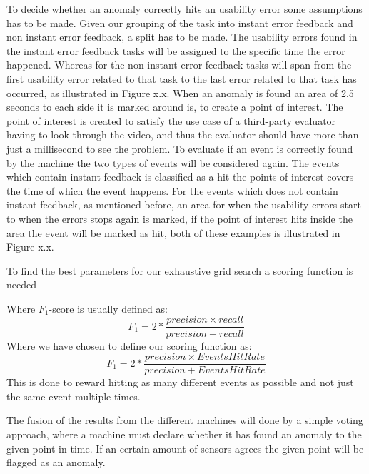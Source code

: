 To decide whether an anomaly correctly hits an usability error some assumptions has to be made. Given our grouping of the task into instant error feedback and non instant error feedback, a split has to be made. The usability errors found in the instant error feedback tasks will be assigned to the specific time the error happened. Whereas for the non instant error feedback tasks will span from the first usability error related to that task to the last error related to that task has occurred, as illustrated in Figure x.x.
When an anomaly is found an area of 2.5 seconds to each side it is marked around is, to create a point of interest. The point of interest is created to satisfy the use case of a third-party evaluator having to look through the video, and thus the evaluator should have more than just a millisecond to see the problem.
To evaluate if an event is correctly found by the machine the two types of events will be considered again.
The events which contain instant feedback is classified as a hit the points of interest covers the time of which the event happens.
For the events which does not contain instant feedback, as mentioned before, an area for when the usability errors start to when the errors stops again is marked, if the point of interest hits inside the area the event will be marked as hit, both of these examples is illustrated in Figure x.x. 

To find the best parameters for our exhaustive grid search a scoring function is needed 

Where $F_{1}$-score is usually defined as: \[F_1 = 2 * \frac{precision \times recall}{precision + recall}\] Where we have chosen to define our scoring function as: \[F_1 = 2 * \frac{precision \times EventsHitRate}{precision + EventsHitRate}\] This is done to reward hitting as many different events as possible and not just the same event multiple times.


The fusion of the results from the different machines will done by a simple voting approach, where a machine must declare whether it has found an anomaly to the given point in time. If an certain amount of sensors agrees the given point will be flagged as an anomaly. 




